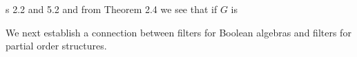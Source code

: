 s 2.2 and 5.2 and from Theorem 2.4 we see that if $G$ is

We next establish a connection between filters for Boolean algebras and filters for partial order structures.
